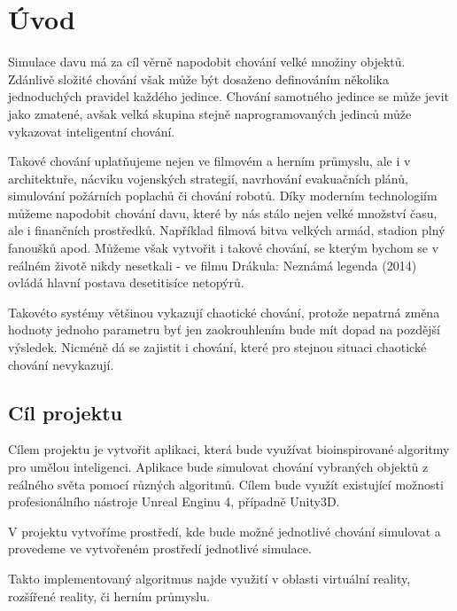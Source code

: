 \section{Úvod}
Simulace davu má za cíl věrně napodobit chování velké množiny objektů. Zdánlivě složité chování však může být dosaženo definováním několika jednoduchých pravidel každého jedince. Chování samotného jedince se může jevit jako zmatené, avšak velká skupina stejně naprogramovaných jedinců může vykazovat inteligentní chování. 
\par
Takové chování uplatňujeme nejen ve filmovém a herním průmyslu, ale i v architektuře, nácviku vojenských strategií, navrhování evakuačních plánů, simulování požárních poplachů či chování robotů. \cite{gammaWeb} Díky moderním technologiím můžeme napodobit chování davu, které by nás stálo nejen velké množství času, ale i finančních prostředků. Například filmová bitva velkých armád, stadion plný fanoušků apod. Můžeme však vytvořit i takové chování, se kterým bychom se v reálném životě nikdy nesetkali - ve filmu Drákula: Neznámá legenda (2014) ovládá hlavní postava desetitisíce netopýrů. \cite{DraculaYoutube}
\par 
Takovéto systémy většinou vykazují chaotické chování, protože nepatrná změna hodnoty jednoho parametru byť jen zaokrouhlením bude mít dopad na pozdější výsledek. Nicméně dá se zajistit i chování, které pro stejnou situaci chaotické chování nevykazují. 
\subsection{Cíl projektu}
Cílem projektu je vytvořit aplikaci, která bude využívat bioinspirované algoritmy pro umělou inteligenci. Aplikace bude simulovat chování vybraných objektů z reálného světa pomocí různých algoritmů. Cílem bude využít existující možnosti profesionálního nástroje Unreal Enginu 4, případně Unity3D.
\par
V projektu vytvoříme prostředí, kde bude možné jednotlivé chování simulovat a provedeme ve vytvořeném prostředí jednotlivé simulace. 
\par
Takto implementovaný algoritmus najde využití v oblasti virtuální reality, rozšířené reality, či herním průmyslu. 
